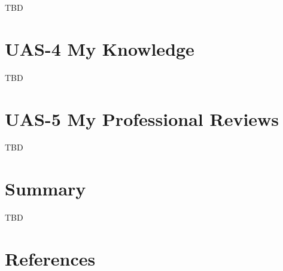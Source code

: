 \documentclass[
  letterpaper,
  DIV=11,
  numbers=noendperiod]{scrreprt}
\begin{document}
TBD


\chapter{UAS-4 My Knowledge}\label{uas-4-my-knowledge}

TBD


\chapter{UAS-5 My Professional
Reviews}\label{uas-5-my-professional-reviews}

TBD


\chapter{Summary}\label{summary}

TBD


\chapter*{References}\label{references}


\label{refs}
\end{document}
